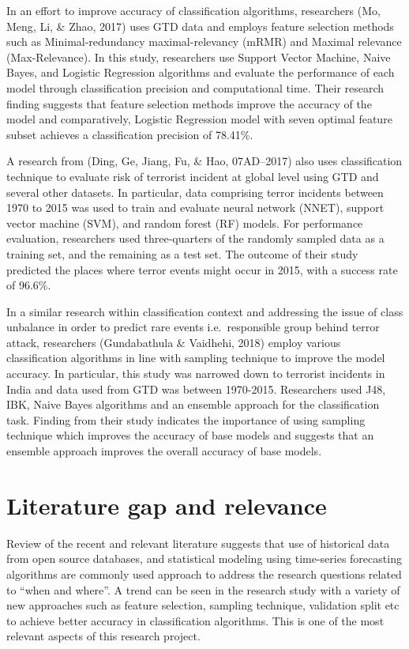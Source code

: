 \documentclass[11pt,oneside,a4paper]{reedthesis}
\begin{document}
In an effort to improve accuracy of classification algorithms,
researchers (Mo, Meng, Li, \& Zhao, 2017) uses GTD data and employs
feature selection methods such as Minimal-redundancy maximal-relevancy
(mRMR) and Maximal relevance (Max-Relevance). In this study, researchers
use Support Vector Machine, Naive Bayes, and Logistic Regression
algorithms and evaluate the performance of each model through
classification precision and computational time. Their research finding
suggests that feature selection methods improve the accuracy of the
model and comparatively, Logistic Regression model with seven optimal
feature subset achieves a classification precision of 78.41\%.

A research from (Ding, Ge, Jiang, Fu, \& Hao, 07AD--2017) also uses
classification technique to evaluate risk of terrorist incident at
global level using GTD and several other datasets. In particular, data
comprising terror incidents between 1970 to 2015 was used to train and
evaluate neural network (NNET), support vector machine (SVM), and random
forest (RF) models. For performance evaluation, researchers used
three-quarters of the randomly sampled data as a training set, and the
remaining as a test set. The outcome of their study predicted the places
where terror events might occur in 2015, with a success rate of 96.6\%.

In a similar research within classification context and addressing the
issue of class unbalance in order to predict rare events
i.e.~responsible group behind terror attack, researchers (Gundabathula
\& Vaidhehi, 2018) employ various classification algorithms in line with
sampling technique to improve the model accuracy. In particular, this
study was narrowed down to terrorist incidents in India and data used
from GTD was between 1970-2015. Researchers used J48, IBK, Naive Bayes
algorithms and an ensemble approach for the classification task. Finding
from their study indicates the importance of using sampling technique
which improves the accuracy of base models and suggests that an ensemble
approach improves the overall accuracy of base models.

\section{Literature gap and
relevance}\label{literature-gap-and-relevance}

Review of the recent and relevant literature suggests that use of
historical data from open source databases, and statistical modeling
using time-series forecasting algorithms are commonly used approach to
address the research questions related to ``when and where''. A trend
can be seen in the research study with a variety of new approaches such
as feature selection, sampling technique, validation split etc to
achieve better accuracy in classification algorithms. This is one of the
most relevant aspects of this research project.
\end{document}
